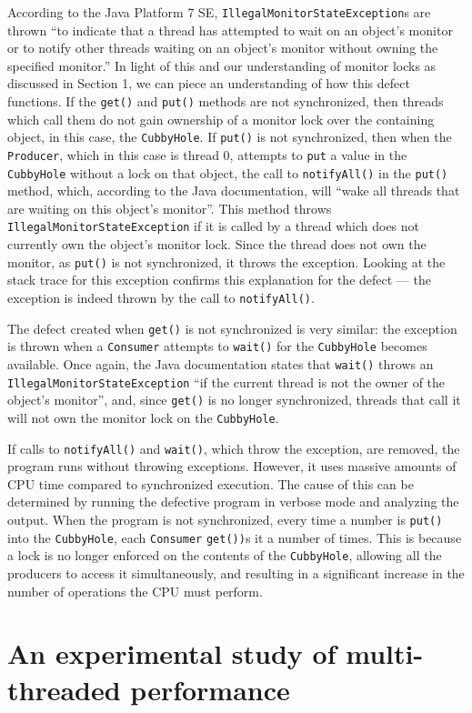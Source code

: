 \documentclass[12pt,a4paper]{article}
\begin{document}
  	According to the Java Platform 7 SE, \allowbreak\texttt{IllegalMonitorStateException}s are thrown ``to indicate that a thread has attempted to wait on an object's monitor or to notify other threads waiting on an object's monitor without owning the specified monitor.'' In light of this and our understanding of monitor locks as discussed in Section 1, we can piece an understanding of how this defect functions. If the \texttt{get()} and \texttt{put()} methods are not synchronized, then threads which call them do not gain ownership of a monitor lock over the containing object, in this case, the \texttt{CubbyHole}. If \texttt{put()} is not synchronized, then when the \texttt{Producer}, which in this case is thread 0, attempts to \texttt{put} a value in the \texttt{CubbyHole} without a lock on that object, the call to \texttt{notifyAll()} in the \texttt{put()} method, which, according to the Java documentation, will ``wake all threads that are waiting on this object's monitor''. This method throws \allowbreak\texttt{IllegalMonitorStateException} if it is called by a thread which does not currently own the object's monitor lock. Since the thread does not own the monitor, as \texttt{put()} is not synchronized, it throws the exception. Looking at the stack trace for this exception confirms this explanation for the defect --- the exception is indeed thrown by the call to \texttt{notifyAll()}.

  	The defect created when \texttt{get()} is not synchronized is very similar: the exception is thrown when a \texttt{Consumer} attempts to \texttt{wait()} for the \texttt{CubbyHole} becomes available. Once again, the Java documentation states that \texttt{wait()} throws an \allowbreak\texttt{IllegalMonitorStateException} ``if the current thread is not the owner of the object's monitor'', and, since \texttt{get()} is no longer synchronized, threads that call it will not own the monitor lock on the \texttt{CubbyHole}.

  	If calls to \texttt{notifyAll()} and \texttt{wait()}, which throw the exception, are removed, the program runs without throwing exceptions. However, it uses massive amounts of CPU time compared to synchronized execution. The cause of this can be determined by running the defective program in verbose mode and analyzing the output. When the program is not synchronized, every time a number is \texttt{put()} into the \texttt{CubbyHole}, each \texttt{Consumer} \texttt{get())}s it a number of times. This is because a lock is no longer enforced on the contents of the \texttt{CubbyHole}, allowing all the producers to access it simultaneously, and resulting in a significant increase in the number of operations the CPU must perform.

  \section{An experimental study of multi-threaded performance}
\end{document}
